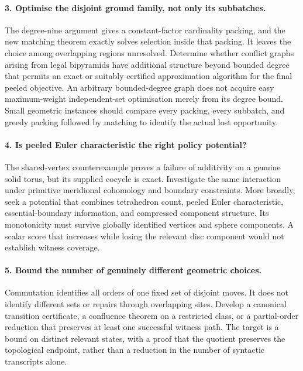 \paragraph{3. Optimise the disjoint ground family, not only its subbatches.}
The degree-nine argument gives a constant-factor cardinality packing, and
the new matching theorem exactly solves selection inside that packing.
It leaves the choice among overlapping regions unresolved. Determine
whether conflict graphs arising from legal bipyramids have additional
structure beyond bounded degree that permits an exact or suitably
certified approximation algorithm for the final peeled objective.
An arbitrary bounded-degree graph does not acquire easy maximum-weight
independent-set optimisation merely from its degree bound. Small geometric
instances should compare every packing, every subbatch, and greedy
packing followed by matching to identify the actual lost opportunity.

\paragraph{4. Is peeled Euler characteristic the right policy potential?}
The shared-vertex counterexample proves a failure of additivity on a genuine
solid torus, but its supplied cocycle is exact. Investigate the same
interaction under primitive meridional cohomology and boundary constraints.
More broadly, seek a potential that combines tetrahedron count, peeled
Euler characteristic, essential-boundary information, and compressed
component structure. Its monotonicity must survive globally identified
vertices and sphere components. A scalar score that increases while
losing the relevant disc component would not establish witness coverage.

\paragraph{5. Bound the number of genuinely different geometric choices.}
Commutation identifies all orders of one fixed set of disjoint moves.
It does not identify different sets or repairs through overlapping sites.
Develop a canonical transition certificate, a confluence theorem on a
restricted class, or a partial-order reduction that preserves at least
one successful witness path. The target is a bound on distinct relevant
states, with a proof that the quotient preserves the topological endpoint,
rather than a reduction in the number of syntactic transcripts alone.

